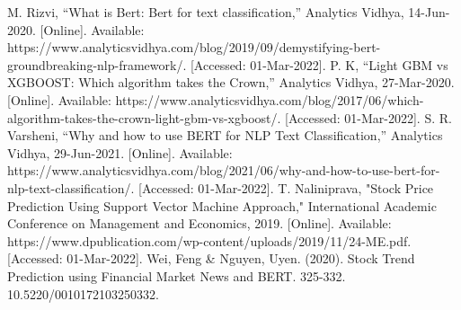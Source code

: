 \documentclass[conference]{IEEEtran}
\begin{document}
\begin{thebibliography}{00}
     M. Rizvi, “What is Bert: Bert for text classification,” Analytics Vidhya, 14-Jun-2020. [Online]. Available: https://www.analyticsvidhya.com/blog/2019/09/demystifying-bert-groundbreaking-nlp-framework/. [Accessed: 01-Mar-2022].
     P. K, “Light GBM vs XGBOOST: Which algorithm takes the Crown,” Analytics Vidhya, 27-Mar-2020. [Online]. Available: https://www.analyticsvidhya.com/blog/2017/06/which-algorithm-takes-the-crown-light-gbm-vs-xgboost/. [Accessed: 01-Mar-2022].
     S. R. Varsheni, “Why and how to use BERT for NLP Text Classification,” Analytics Vidhya, 29-Jun-2021. [Online]. Available: https://www.analyticsvidhya.com/blog/2021/06/why-and-how-to-use-bert-for-nlp-text-classification/. [Accessed: 01-Mar-2022].
     T. Naliniprava, "Stock Price Prediction Using Support Vector Machine Approach," International Academic Conference on Management and Economics, 2019. [Online]. Available: https://www.dpublication.com/wp-content/uploads/2019/11/24-ME.pdf. [Accessed: 01-Mar-2022].
     Wei, Feng \& Nguyen, Uyen. (2020). Stock Trend Prediction using Financial Market News and BERT. 325-332. 10.5220/0010172103250332.
\end{thebibliography}
\end{document}
